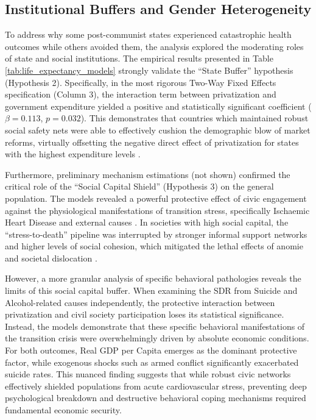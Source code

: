 \documentclass[en,magisterska]{pracamgr}
\begin{document}
\subsection{Institutional Buffers and Gender Heterogeneity}

To address why some post-communist states experienced catastrophic health outcomes while others avoided them, the analysis explored the moderating roles of state and social institutions. 
The empirical results presented in Table \ref{tab:life_expectancy_models} strongly validate the ``State Buffer'' hypothesis (Hypothesis 2). Specifically, in the most rigorous Two-Way Fixed 
Effects specification (Column 3), the interaction term between privatization and government expenditure yielded a positive and statistically significant coefficient ($\beta = 0.113$, 
$p = 0.032$). This demonstrates that countries which maintained robust social safety nets were able to effectively cushion the demographic blow of market reforms, virtually offsetting the 
negative direct effect of privatization for states with the highest expenditure levels \citep{Cornia2016, Hamm2012}.

Furthermore, preliminary mechanism estimations (not shown) confirmed the critical role of the ``Social Capital Shield'' (Hypothesis 3) on the general population. The models revealed a 
powerful protective effect of civic engagement against the physiological manifestations of transition stress, specifically Ischaemic Heart Disease and external causes \citep{Leon1998, 
Brainerd2006}. In societies with high social capital, the ``stress-to-death'' pipeline was interrupted by stronger informal support networks and higher levels of social cohesion, which 
mitigated the lethal effects of anomie and societal dislocation \citep{Cornia2016, Stuckler2009}. 

However, a more granular analysis of specific behavioral pathologies reveals the limits of this social capital buffer. When examining the SDR from Suicide and Alcohol-related causes 
independently, the protective interaction between privatization and civil society participation loses its statistical significance. Instead, the models demonstrate that these specific 
behavioral manifestations of the transition crisis were overwhelmingly driven by absolute economic conditions. For both outcomes, Real GDP per Capita emerges as the dominant protective 
factor, while exogenous shocks such as armed conflict significantly exacerbated suicide rates. This nuanced finding suggests that while robust civic networks effectively shielded populations 
from acute cardiovascular stress, preventing deep psychological breakdown and destructive behavioral coping mechanisms required fundamental economic security.
\end{document}
